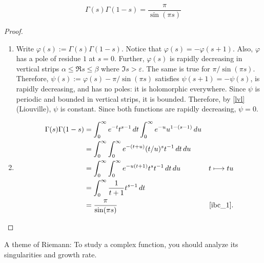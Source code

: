 \documentclass[11pt, oneside,margin=1in]{article}
\begin{document}
\begin{proposition}\label{}\text{}
\[
	\Gamma(s)\Gamma (1-s) = \frac{\pi}{\sin  (\pi s)}
\]
\end{proposition}
\begin{proof}
\text{}
\begin{enumerate}
	\item Write $\varphi(s) := \Gamma (s)\Gamma (1-s)$. Notice that $\varphi(s) = - \varphi (s+1)$. Also, $\varphi$ has a pole of residue $1$ at $s=0$. Further, $\varphi(s)$ is rapidly decreasing in vertical strips $\alpha\le\Re s\le \beta$ where $\Im s>\varepsilon$. The same is true for $\pi/\sin(\pi s)$. Therefore, $\psi(s) :=  \varphi(s) - \pi/\sin (\pi s)$ satisfies $\psi(s+1)=-\psi (s)$, is rapidly decreasing, and has no poles: it is holomorphic everywhere. Since $\psi$ is periodic and bounded in vertical strips, it is bounded. Therefore, by \cref{lvl} (Liouville), $\psi$ is constant. Since both functions are rapidly decreasing, $\psi = 0$.
	\item \begin{align*}
			\Gamma(s)\Gamma (1-s) &=  \int_0^\infty e^{-t}t^{s-1} \, dt \int_0^\infty e^{-u} u^{1-(s-1)}\, du\\
					      &= \int_0^\infty\int_0^\infty e^{- (t+u) } (t/u)^s t\inv \, dt\, du\\
					      &= \int_0^\infty \int_0^\infty e^{-u (t+1)} t^s t\inv \,dt\,du&t\longmapsto tu\\
					      &= \int_0^\infty \frac{1}{t+1} t^{s-1} \,dt\\
					      &= \frac{\pi}{\sin  (\pi s)} & \textrm{\cref{ibc_1}.} 
	\end{align*}
\end{enumerate}
\end{proof}

\begin{remark}
	A theme of Riemann: To study a complex function, you should analyze its singularities and growth rate.
\end{remark}
\end{document}
